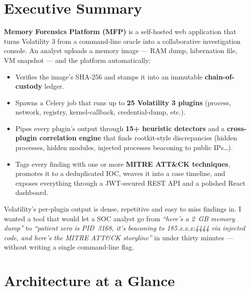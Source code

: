 \documentclass[11pt,a4paper]{article}
\begin{document}
\section{Executive Summary}

\textbf{Memory Forensics Platform (MFP)} is a self-hosted web application that
turns Volatility 3 from a command-line oracle into a collaborative
investigation console. An analyst uploads a memory image — RAM dump, hibernation
file, VM snapshot — and the platform automatically:

\begin{itemize}[leftmargin=1.2em,itemsep=2pt]
  \item Verifies the image's SHA-256 and stamps it into an immutable
        \textbf{chain-of-custody} ledger.
  \item Spawns a Celery job that runs up to \textbf{25 Volatility 3 plugins}
        (process, network, registry, kernel-callback, credential-dump, etc.).
  \item Pipes every plugin's output through \textbf{15+ heuristic detectors}
        and a \textbf{cross-plugin correlation engine} that finds
        rootkit-style discrepancies (hidden processes, hidden modules,
        injected processes beaconing to public IPs\dots).
  \item Tags every finding with one or more \textbf{MITRE ATT\&CK techniques},
        promotes it to a deduplicated IOC, weaves it into a case timeline,
        and exposes everything through a JWT-secured REST API and a
        polished React dashboard.
\end{itemize}

\begin{infobox}
Volatility's per-plugin output is dense, repetitive and easy to miss findings
in. I wanted a tool that would let a SOC analyst go from
\emph{``here's a 2~GB memory dump''} to \emph{``patient zero is PID~3168, it's
beaconing to 185.x.x.x:4444 via injected code, and here's the MITRE ATT\&CK
storyline''} in under thirty minutes — without writing a single command-line
flag.
\end{infobox}

\section{Architecture at a Glance}
\end{document}
